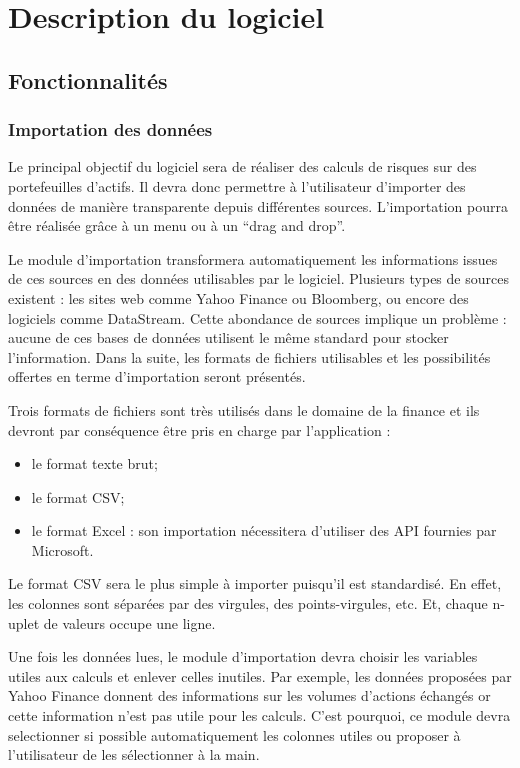 \chapter{Description du logiciel}

\section{Fonctionnalités}

	\subsection{Importation des données}
		Le principal objectif du logiciel sera de réaliser des calculs de risques sur des portefeuilles d’actifs. Il devra donc permettre à l’utilisateur d’importer des données de manière transparente depuis différentes sources. L’importation pourra être réalisée grâce à un menu ou à un “drag and drop”. 

		Le module d’importation transformera automatiquement les informations issues de ces sources en des données utilisables par le logiciel. Plusieurs types de sources existent : les sites web comme Yahoo Finance ou Bloomberg, ou encore des logiciels comme DataStream. Cette abondance de sources implique un problème : aucune de ces bases de données utilisent le même standard pour stocker l’information. Dans la suite, les formats de fichiers utilisables et les possibilités offertes en terme d’importation seront présentés.

		Trois formats de fichiers sont très utilisés dans le domaine de la finance et ils devront par conséquence être pris en charge par l’application :
		\begin{itemize}
			\item le format texte brut;
			\item le format CSV;
			\item le format Excel : son importation nécessitera d’utiliser des API fournies par Microsoft.
		\end{itemize}

		Le format CSV sera le plus simple à importer puisqu’il est standardisé. En effet, les colonnes sont séparées par des virgules, des points-virgules, etc. Et, chaque n-uplet de valeurs occupe une ligne.

		Une fois les données lues, le module d’importation devra choisir les variables utiles aux calculs et enlever celles inutiles. Par exemple, les données proposées par Yahoo Finance donnent des informations sur les volumes d’actions échangés or cette information n’est pas utile pour les calculs. C’est pourquoi, ce module devra selectionner si possible automatiquement les colonnes utiles ou proposer à l’utilisateur de les sélectionner à la main. 


